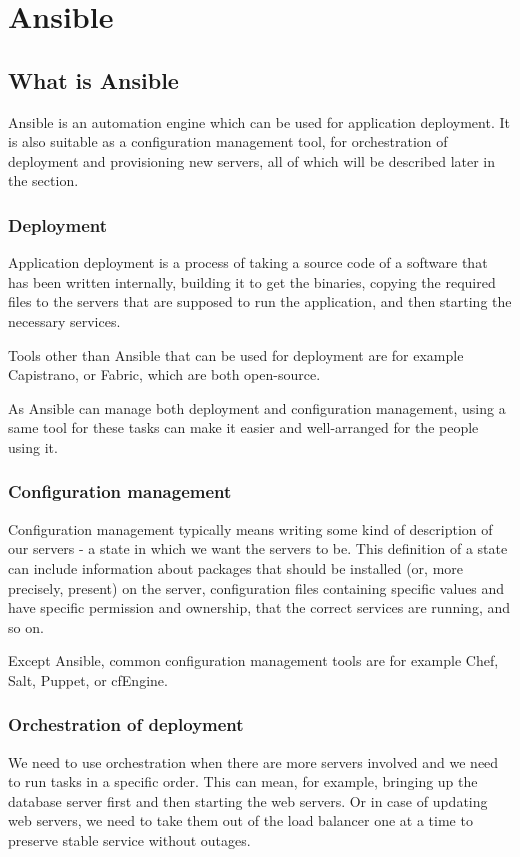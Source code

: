 \section{Ansible}

\subsection{What is Ansible}
Ansible is an automation engine which can be used for application deployment. It is also suitable as a configuration management tool, for orchestration of deployment and provisioning new servers, all of which will be described later in the section. \cite{AnsibleOverview}

\subsubsection*{Deployment}
Application deployment is a process of taking a source code of a software that has been written internally, building it to get the binaries, copying the required files to the servers that are supposed to run the application, and then starting the necessary services.

Tools other than Ansible that can be used for deployment are for example Capistrano, or Fabric, which are both open-source. \cite{UpAndRunning}

As Ansible can manage both deployment and configuration management, using a same tool for these tasks can make it easier and well-arranged for the people using it.

\subsubsection*{Configuration management}
Configuration management typically means writing some kind of description of our servers - a state in which we want the servers to be. This definition of a state can include information about packages that should be installed (or, more precisely, present) on the server, configuration files containing specific values and have specific permission and ownership, that the correct services are running, and so on.

Except Ansible, common configuration management tools are for example Chef, Salt, Puppet, or cfEngine.  \cite{UpAndRunning}

\subsubsection*{Orchestration of deployment}
We need to use orchestration when there are more servers involved and we need to run tasks in a specific order. This can mean, for example, bringing up the database server first and then starting the web servers. Or in case of updating web servers, we need to take them out of the load balancer one at a time to preserve stable service without outages.

